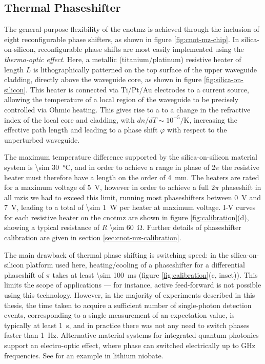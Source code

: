 \subsection{Thermal Phaseshifter} 
\label{sec:thermal-phaseshifter}
The general-purpose flexibility of the \gls{cnotmz} is achieved through the inclusion of eight reconfigurable phase shifters, as shown in figure \ref{fig:cnot-mz-chip}. 
In silica-on-silicon, reconfigurable phase shifts are most easily implemented using the \emph{thermo-optic effect}. Here, a metallic (titanium/platinum) resistive heater of length $L$ is lithographically patterned on the top surface of the upper waveguide cladding, directly above the waveguide core, as shown in figure \ref{fig:silica-on-silicon}. This heater is connected via Ti/Pt/Au electrodes to a current source, allowing the temperature of a local region of the waveguide to be precisely controlled via Ohmic heating. This gives rise to a to a change in the refractive index of the local core and cladding, with $dn/dT \sim 10^{-5} / \text{K}$, increasing the effective path length and leading to a phase shift $\varphi$ with respect to the unperturbed waveguide. 

The maximum temperature difference supported by the silica-on-silicon material system is \SI{\sim 30}{\degree}C, and in order to achieve a range in phase of 2$\pi$ the resistive heater must therefore have a length on the order of \SI{4}{\milli \metre}. 
The heaters are rated for a maximum voltage of \SI{5}{\volt}, however in order to achieve a full $2\pi$ phaseshift in all \glspl{mzi} we had to exceed this limit, running most phaseshifters between \SI{0}{\volt} and \SI{7}{\volt}, leading to a total of  \SI{\sim 1}{\watt} per heater at maximum voltage. I-V curves for each resistive heater on the \gls{cnotmz} are shown in figure \ref{fig:calibration}(d), showing a typical resistance of $R$ \SI{\sim 60}{\ohm}. Further details of phaseshifter calibration are given in section \ref{sec:cnot-mz-calibration}.

The main drawback of thermal phase shifting is switching speed: in the silica-on-silicon platform used here, heating/cooling of a phaseshifter for a differential phaseshift of $\pi$ takes at least \SI{\sim 100}{\milli \second} (figure \ref{fig:calibration}(c, inset)). This limits the scope of applications --- for instance, active feed-forward is not possible using this technology. However, in the majority of experiments described in this thesis, the time taken to acquire a sufficient number of single-photon detection events, corresponding to a single measurement of an expectation value, is typically at least \SI{1}{\second}, and in practice there was not any need to switch phases faster than \SI{1}{\hertz}. Alternative material systems for integrated quantum photonics support an electro-optic effect, where phase can switched electrically up to \si{\giga \hertz} frequencies. See \cite{Bonneau2012b} for an example in lithium niobate.

